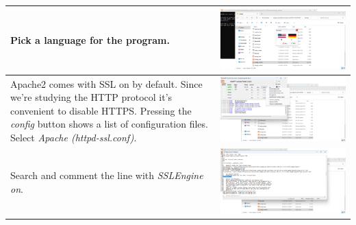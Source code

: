 \documentclass[11pt,a4paper]{report}
\begin{document}
\begin{flushleft}
\begin{center}
\begin{longtable}{ m{5cm} l }
                        Pick a language for the program.
                        & \includegraphics[scale=0.303,valign=c]{phase1/images/install_xampp14} \\
                        \hline
                        
                        Apache2 comes with SSL on by default. Since we're studying the HTTP protocol it's convenient to disable HTTPS. Pressing the \textit{config} button shows a list of configuration files. Select \textit{Apache (httpd-ssl.conf)}.
                        & \includegraphics[scale=0.285,valign=c]{phase1/images/install_xampp15} \\
                        \hline
                        
                        Search and comment the line with \textit{SSLEngine on}.
                        & \includegraphics[scale=0.285,valign=c]{phase1/images/install_xampp16} \\
                        \hline
                        

\end{longtable}
\end{center}
\end{flushleft}
\end{document}
